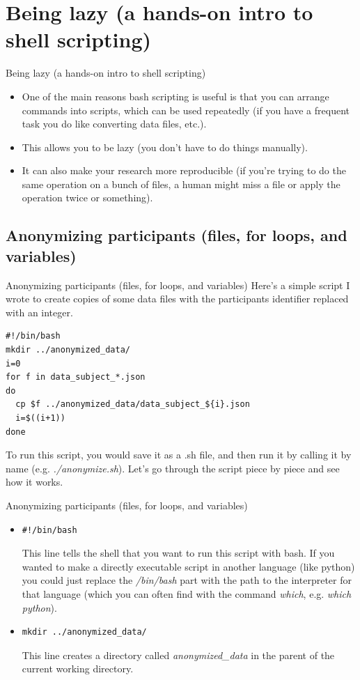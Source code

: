\documentclass{beamer}
\begin{document}
\section{Being lazy (a hands-on intro to shell scripting)}
\begin{frame}{Being lazy (a hands-on intro to shell scripting)}
\begin{itemize}
\item<1-> One of the main reasons bash scripting is useful is that you can arrange commands into scripts, which can be used repeatedly (if you have a frequent task you do like converting data files, etc.). 
\item<2-> This allows you to be lazy (you don't have to do things manually).
\item<3-> It can also make your research more reproducible (if you're trying to do the same operation on a bunch of files, a human might miss a file or apply the operation twice or something).
\end{itemize}
\end{frame}


\subsection{Anonymizing participants (files, for loops, and variables)}
\begin{frame}[fragile]{Anonymizing participants (files, for loops, and variables)}
Here's a simple script I wrote to create copies of some data files with the participants identifier replaced with an integer. 
\begin{lstlisting}[title=anonymize.sh]
#!/bin/bash
mkdir ../anonymized_data/
i=0
for f in data_subject_*.json
do
  cp $f ../anonymized_data/data_subject_${i}.json
  i=$((i+1))
done
\end{lstlisting}
To run this script, you would save it as a .sh file, and then run it by calling it by name (e.g. \emph{./anonymize.sh}). Let's go through the script piece by piece and see how it works. 
\end{frame}

\begin{frame}[fragile]{Anonymizing participants (files, for loops, and variables)}
\begin{itemize}
\item<1->
\begin{lstlisting}
#!/bin/bash
\end{lstlisting} 
This line tells the shell that you want to run this script with bash. If you wanted to make a directly executable script in another language (like python) you could just replace the \emph{/bin/bash} part with the path to the interpreter for that language (which you can often find with the command \emph{which}, e.g. \emph{which python}).
\item<2->
\begin{lstlisting}
mkdir ../anonymized_data/
\end{lstlisting}
This line creates a directory called \emph{anonymized\_data} in the parent of the current working directory.
\end{itemize}
\end{frame}
\end{document}
